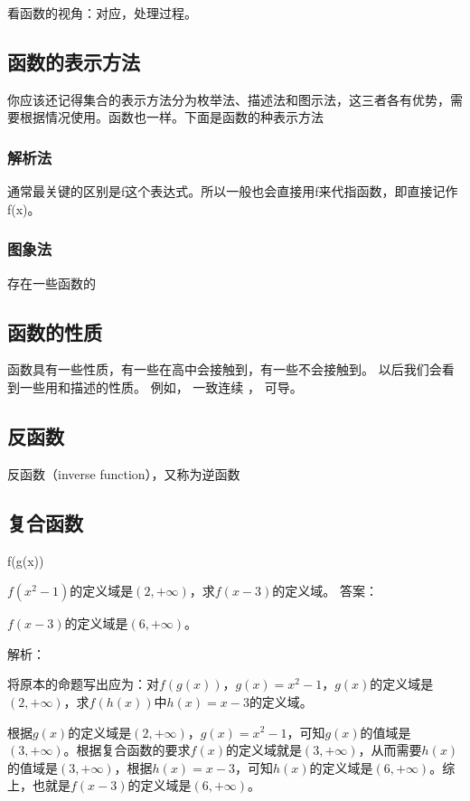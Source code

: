 看函数的视角：对应，处理过程。


\subsection{函数的表示方法}

你应该还记得集合的表示方法分为枚举法、描述法和图示法，这三者各有优势，需要根据情况使用。函数也一样。下面是函数的种表示方法

\subsubsection{解析法}

通常最关键的区别是f这个表达式。所以一般也会直接用f来代指函数，即直接记作f(x)。

\subsubsection{图象法}
存在一些函数的

\subsection{函数的性质}

函数具有一些性质，有一些在高中会接触到，有一些不会接触到。
以后我们会看到一些用和描述的性质。 例如， 一致连续 %
， 可导。
\subsection{反函数}

反函数（inverse function），又称为逆函数
\subsection{复合函数}

f(g(x))

\begin{exercise}{$f(x^2-1)$的定义域是$(2,+\infty)$，求$f(x-3)$的定义域。}
答案：

$f(x-3)$的定义域是$(6,+\infty)$。

解析：

将原本的命题写出应为：对$f(g(x))$，$g(x)=x^2-1$，$g(x)$的定义域是$(2,+\infty)$，求$f(h(x))$中$h(x)=x-3$的定义域。

根据$g(x)$的定义域是$(2,+\infty)$，$g(x)=x^2-1$，可知$g(x)$的值域是$(3,+\infty)$。根据复合函数的要求$f(x)$的定义域就是$(3,+\infty)$，从而需要$h(x)$的值域是$(3,+\infty)$，根据$h(x)=x-3$，可知$h(x)$的定义域是$(6,+\infty)$。综上，也就是$f(x-3)$的定义域是$(6,+\infty)$。

\end{exercise}

